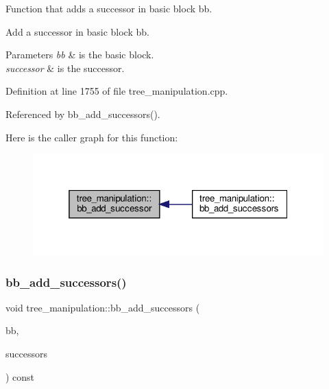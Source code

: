 Function that adds a successor in basic block bb. 

Add a successor in basic block bb.


\begin{DoxyParams}{Parameters}
{\em bb} & is the basic block. \\
\hline
{\em successor} & is the successor. \\
\hline
\end{DoxyParams}


Definition at line 1755 of file tree\+\_\+manipulation.\+cpp.



Referenced by bb\+\_\+add\+\_\+successors().

Here is the caller graph for this function\+:
\nopagebreak
\begin{figure}[H]
\begin{center}
\leavevmode
\includegraphics[width=319pt]{d0/d99/classtree__manipulation_aa16ba8350ff32b94146aba631fc1bea6_icgraph}
\end{center}
\end{figure}
\mbox{\label{classtree__manipulation_a089337a8687af25c855ac7fa0413a628}} 
\subsubsection{\texorpdfstring{bb\+\_\+add\+\_\+successors()}{bb\_add\_successors()}}
{\footnotesize\ttfamily void tree\+\_\+manipulation\+::bb\+\_\+add\+\_\+successors (\begin{DoxyParamCaption}\item[{bloc\+Ref \&}]{bb,  }\item[{const std\+::vector$<$ unsigned int $>$ \&}]{successors }\end{DoxyParamCaption}) const}



